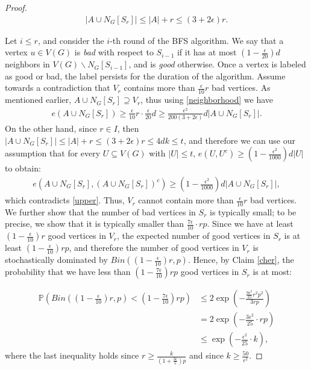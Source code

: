 \documentclass[10pt,a4paper]{amsart}
\begin{document}
\begin{proof}
    \begin{align}\label{neighborhood}
        |A\cup N_G[S_r]|\le |A|+r\le (3+2\epsilon)r.
    \end{align}

    Let $i\le r$, and consider the $i$-th round of the BFS algorithm. We say that a vertex $u\in V(G)$ is \textit{bad} with respect to $S_{i-1}$ if it has at most $\left(1-\frac{\epsilon}{20}\right)d$ neighbors in $V(G)\backslash N_G[S_{i-1}]$, and is \textit{good} otherwise. Once a vertex is labeled as good or bad, the label persists for the duration of the algorithm.
    Assume towards a contradiction that $V_r$ contains more than $\frac{\epsilon}{10} r$ bad vertices. As mentioned earlier, $A\cup N_G[S_r]\supseteq V_r$, thus using \eqref{neighborhood} we have
    \begin{align}\label{upper}
        e(A\cup N_G[S_r])\ge \frac{\epsilon}{10}r\cdot \frac{\epsilon}{20} d\ge \frac{\epsilon^2}{200(3+2\epsilon)}d|A\cup N_G[S_r]|.
    \end{align}
    On the other hand, since $r\in I$, then $|A\cup N_G[S_r]|\le |A|+r\le (3+2\epsilon)r\le 4dk\le t$, and therefore we can use our assumption that for every $U\subseteq V(G)$ with $|U|\le t$, $e(U,U^c)\ge \left(1-\frac{\epsilon^2}{1000}\right)d|U|$ to obtain:
    \begin{align*}
        e(A\cup N_G[S_r],(A\cup N_G[S_r])^c)\ge \left(1-\frac{\epsilon^2}{1000}\right)d|A\cup N_G[S_r]|,
    \end{align*}
    which contradicts \eqref{upper}. Thus, $V_r$ cannot contain more than $\frac{\epsilon}{10} r$ bad vertices. We further show that the number of bad vertices in $S_r$ is typically small; to be precise, we show that it is typically smaller than $\frac{7\epsilon}{10}\cdot rp$. Since we have at least $\left(1-\frac{\epsilon}{10}\right)r$ good vertices in $V_r$, the expected number of good vertices in $S_r$ is at least $\left(1-\frac{\epsilon}{10}\right)rp$, and therefore the number of good vertices in $V_r$ is stochastically dominated by $Bin\left(\left(1-\frac{\epsilon}{10}\right)r,p\right)$. Hence, by Claim \ref{cher}, the probability that we have less than $\left(1-\frac{7\epsilon}{10}\right)rp$ good vertices in $S_r$ is at most:

    \begin{align*}
        \mathbb{P}\left(Bin\left(\left(1-\frac{\epsilon}{10}\right)r,p\right)<\left(1-\frac{7\epsilon}{10}\right)rp\right)&\le 2\exp\left(-\frac{\frac{9\epsilon^2}{25} r^2p^2}{3rp}\right)\\
        &=2\exp\left(-\frac{3\epsilon^2}{25}\cdot rp\right)\\
        &\le \exp\left(-\frac{\epsilon^2}{25}\cdot k\right),
    \end{align*}
    where the last inequality holds since $r\ge\frac{k}{\left(1+\frac{3\epsilon}{5}\right)p}$ and since $k\ge \frac{50}{\epsilon^2}$.
    

\end{proof}
\end{document}
